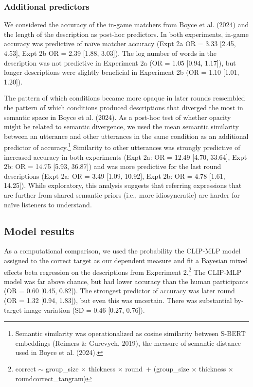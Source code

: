 \documentclass[10pt, letterpaper]{article}
\begin{document}
\subsubsection{Additional predictors}\label{additional-predictors}

We considered the accuracy of the in-game matchers from Boyce et al.
(2024) and the length of the description as post-hoc predictors. In both
experiments, in-game accuracy was predictive of naïve matcher accuracy
(Expt 2a OR = 3.33 {[}2.45, 4.53{]}, Expt 2b OR = 2.39 {[}1.88,
3.03{]}). The log number of words in the description was not predictive
in Experiment 2a (OR = 1.05 {[}0.94, 1.17{]}), but longer descriptions
were slightly beneficial in Experiment 2b (OR = 1.10 {[}1.01, 1.20{]}).

The pattern of which conditions became more opaque in later rounds
ressembled the pattern of which conditions produced descriptions that
diverged the most in semantic space in Boyce et al. (2024). As a
post-hoc test of whether opacity might be related to semantic
divergence, we used the mean semantic similarity between an utterance
and other utterances in the same condition as an additional predictor of
accuracy.\footnote{Semantic similarity was operationalized as cosine
  similarity between S-BERT embeddings (Reimers \& Gurevych, 2019), the
  measure of semantic distance used in Boyce et al. (2024).} Similarity
to other utterances was strongly predictive of increased accuracy in
both experiments (Expt 2a: OR = 12.49 {[}4.70, 33.64{]}, Expt 2b: OR =
14.75 {[}5.93, 36.87{]}) and was more predictive for the last round
descriptions (Expt 2a: OR = 3.49 {[}1.09, 10.92{]}, Expt 2b: OR = 4.78
{[}1.61, 14.25{]}). While exploratory, this analysis suggests that
referring expressions that are further from shared semantic priors
(i.e., more idiosyncratic) are harder for naïve listeners to understand.

\subsection{Model results}\label{model-results}

As a computational comparison, we used the probability the CLIP-MLP
model assigned to the correct target as our dependent measure and fit a
Bayesian mixed effects beta regression on the descriptions from
Experiment 2.\footnote{correct \({\sim}\) group\_size \({\times}\)
  thickness \({\times}\) round~\({+}\) (group\_size \({\times}\)
  thickness \({\times}\) round\textbar correct\_tangram)} The CLIP-MLP
model was far above chance, but had lower accuracy than the human
participants (OR = 0.60 {[}0.45, 0.82{]}). The strongest predictor of
accuracy was later round (OR = 1.32 {[}0.94, 1.83{]}), but even this was
uncertain. There was substantial by-target image variation (SD = 0.46
{[}0.27, 0.76{]}).
\end{document}
